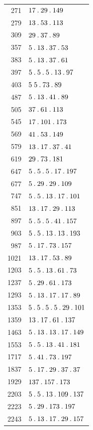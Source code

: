 \begin{longtable}{@{}r|l@{}}
271 & $17\mathbin{.} 29\mathbin{.} 149$\\
279 & $13\mathbin{.} 53\mathbin{.} 113$\\
309 & $29\mathbin{.} 37\mathbin{.} 89$\\
357 & $5\mathbin{.} 13\mathbin{.} 37\mathbin{.} 53$\\
383 & $5\mathbin{.} 13\mathbin{.} 37\mathbin{.} 61$\\
397 & $5\mathbin{.} 5\mathbin{.} 5\mathbin{.} 13\mathbin{.} 97$\\
403 & $5\;5\mathbin{.} 73\mathbin{.} 89$\\
487 & $5\mathbin{.} 13\mathbin{.} 41\mathbin{.} 89$\\
505 & $37\mathbin{.} 61\mathbin{.} 113$\\
545 & $17\mathbin{.} 101\mathbin{.} 173$\\
569 & $41\mathbin{.} 53\mathbin{.} 149$\\
579 & $13\mathbin{.} 17\mathbin{.} 37\mathbin{.} 41$\\
619 & $29\mathbin{.} 73\mathbin{.} 181$\\
647 & $5\mathbin{.} 5\mathbin{.} 5\mathbin{.} 17\mathbin{.} 197$\\
677 & $5\mathbin{.} 29\mathbin{.} 29\mathbin{.} 109$\\
747 & $5\mathbin{.} 5\mathbin{.} 13\mathbin{.} 17\mathbin{.} 101$\\
851 & $13\mathbin{.} 17\mathbin{.} 29\mathbin{.} 113$\\
897 & $5\mathbin{.} 5\mathbin{.} 5\mathbin{.} 41\mathbin{.} 157$\\
903 & $5\mathbin{.} 5\mathbin{.} 13\mathbin{.} 13\mathbin{.} 193$\\
987 & $5\mathbin{.} 17\mathbin{.} 73\mathbin{.} 157$\\
1021 & $13\mathbin{.} 17\mathbin{.} 53\mathbin{.} 89$\\
1203 & $5\mathbin{.} 5\mathbin{.} 13\mathbin{.} 61\mathbin{.} 73$\\
1237 & $5\mathbin{.} 29\mathbin{.} 61\mathbin{.} 173$\\
1293 & $5\mathbin{.} 13\mathbin{.} 17\mathbin{.} 17\mathbin{.} 89$\\
1353 & $5\mathbin{.} 5\mathbin{.} 5\mathbin{.} 5\mathbin{.} 29\mathbin{.} 101$\\
1359 & $13\mathbin{.} 17\mathbin{.} 61\mathbin{.} 137$\\
1463 & $5\mathbin{.} 13\mathbin{.} 13\mathbin{.} 17\mathbin{.} 149$\\
1553 & $5\mathbin{.} 5\mathbin{.} 13\mathbin{.} 41\mathbin{.} 181$\\
1717 & $5\mathbin{.} 41\mathbin{.} 73\mathbin{.} 197$\\
1837 & $5\mathbin{.} 17\mathbin{.} 29\mathbin{.} 37\mathbin{.} 37$\\
1929 & $137\mathbin{.} 157\mathbin{.} 173$\\
2203 & $5\mathbin{.} 5\mathbin{.} 13\mathbin{.} 109\mathbin{.} 137$\\
2223 & $5\mathbin{.} 29\mathbin{.} 173\mathbin{.} 197$\\
2243 & $5\mathbin{.} 13\mathbin{.} 17\mathbin{.} 29\mathbin{.} 157$\\

\end{longtable}
